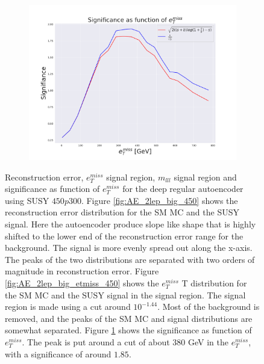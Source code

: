 \begin{figure}[H]
    \begin{subfigure}{.50\textwidth}
        \includegraphics[width=\textwidth]{Figures/AE_testing/big/2lep/significance_etmiss_450p0p0300_-1.4360553938127363.pdf}
        \caption{}
        \label{fig:AE_2lep_big_signi_450}
    \end{subfigure}
    \hfill      
    \caption[2lep deep network | $450p300$ | AE]{Reconstruction error, $e_T^{miss}$ signal region, $m_{lll}$ signal region and significance as function of 
    $e_T^{miss}$ for the deep regular autoencoder using SUSY $450p300$. 
    Figure \ref{fig:AE_2lep_big_450} shows the reconstruction error distribution for the SM MC and the SUSY signal. 
Here the autoencoder produce slope like shape that is highly shifted to the lower end of the reconstruction error range
for the background. The signal is more evenly spread out along the x-axis. The peaks of the two distributions are separated
with two orders of magnitude in reconstruction error. Figure \ref{fig:AE_2lep_big_etmiss_450} shows the $e_T^{miss}$
T distribution for the SM MC and the SUSY signal in the signal region. The signal region is made using a cut around
$10^{-1.44}$. Most of the background is removed, and the peaks of the SM MC and signal distributions are
somewhat separated.  Figure \ref{fig:AE_2lep_big_signi_450} shows the significance as function of $e_T^{miss}$. The peak is put 
around a cut of about 380 GeV in the $e_T^{miss}$, with a significance of around $1.85$.}
    \label{fig:AE_2lep_big_rec_sig_signi_450}
\end{figure}



